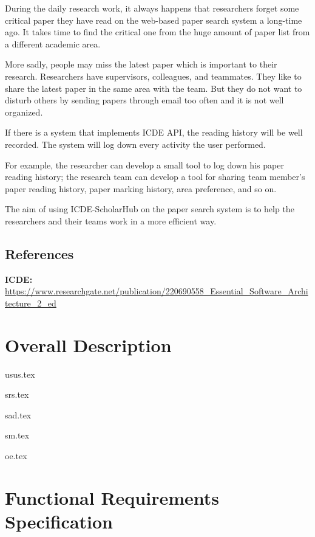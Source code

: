 \documentclass[]{scrreprt}
\begin{document}
\noindent
During the daily research work, it always happens that researchers forget some critical paper they have read on the web-based paper search system a long-time ago. It takes time to find the critical one from the huge amount of paper list from a different academic area.

More sadly, people may miss the latest paper which is important to their research. Researchers have supervisors, colleagues, and teammates. They like to share the latest paper in the same area with the team. But they do not want to disturb others by sending papers through email too often and it is not well organized.

If there is a  system that implements ICDE API, the reading history will be well recorded. The system will log down every activity the user performed.

For example, the researcher can develop a small tool to log down his paper reading history; the research team can develop a tool for sharing team member’s paper reading history,  paper marking history, area preference, and so on.

The aim of using ICDE-ScholarHub on the paper search system is to help the researchers and their teams work in a more efficient way.

\section{References}

\noindent
\textbf{ICDE: } \url{https://www.researchgate.net/publication/220690558_Essential_Software_Architecture_2_ed}

\chapter{Overall Description}

{usus.tex}

{srs.tex}

{sad.tex}

{sm.tex}

{oe.tex}

\chapter{Functional Requirements Specification}
\end{document}
